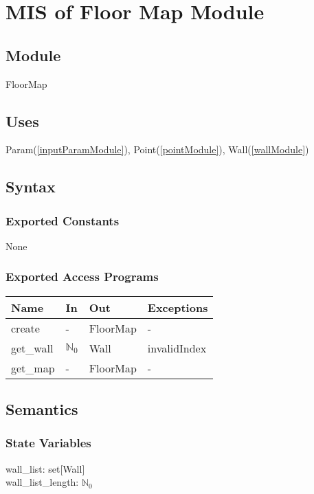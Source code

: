 \documentclass[12pt, titlepage]{article}
\begin{document}
\newpage
\section{MIS of Floor Map Module} \label{floorMap}

\subsection{Module}

FloorMap

\subsection{Uses}

Param(\autoref{inputParamModule}), Point(\autoref{pointModule}), Wall(\autoref{wallModule})

\subsection{Syntax}

\subsubsection{Exported Constants}

None

\subsubsection{Exported Access Programs}

\begin{center}
\begin{tabular}{p{4cm} p{2.7cm} p{2cm} p{4cm}}
\hline
\textbf{Name} & \textbf{In} & \textbf{Out} & \textbf{Exceptions} \\
\hline
create & - & FloorMap & - \\
get\_wall & $\mathbb{N}_0$ & Wall & invalidIndex \\
get\_map & - & FloorMap & - \\
\hline
\end{tabular}
\end{center}

\subsection{Semantics}

\subsubsection{State Variables}
wall\_list: set[Wall]\\
wall\_list\_length: $\mathbb{N}_0$\\
\end{document}
